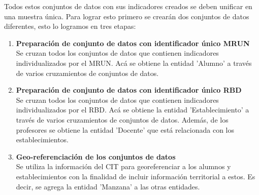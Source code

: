Todos estos conjuntos de datos con sus indicadores creados se deben unificar en una muestra única. Para lograr esto primero se crearán dos conjuntos de datos diferentes, esto lo logramos en tres etapas:
\begin{enumerate}[label=\Roman*]
\item \textbf{Preparación de conjunto de datos con identificador único MRUN} \hfill \\
Se cruzan todos los conjuntos de datos que contienen indicadores individualizados por el MRUN. Acá se obtiene la entidad 'Alumno' a través de varios cruzamientos de conjuntos de datos.
\item \textbf{Preparación de conjunto de datos con identificador único RBD} \hfill \\
Se cruzan todos los conjuntos de datos que contienen indicadores individualizados por el RBD. Acá se obtiene la entidad 'Establecimiento' a través de varios cruzamientos de conjuntos de datos. Además, de los profesores se obtiene la entidad 'Docente' que está relacionada con los establecimientos.
\item \textbf{Geo-referenciación de los conjuntos de datos} \hfill \\
Se utiliza la información del CIT para georeferenciar a los alumnos y establecimientos con la finalidad de incluir información territorial a estos. Es decir, se agrega la entidad 'Manzana' a las otras entidades.
\end{enumerate}

